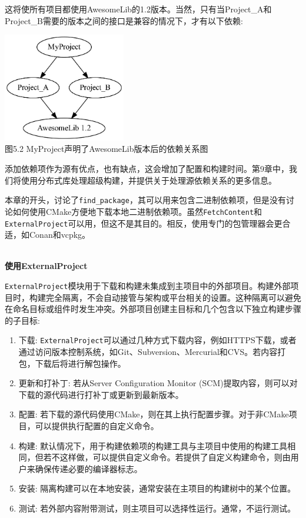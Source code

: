 这将使所有项目都使用AwesomeLib的1.2版本。当然，只有当Project\_A和Project\_B需要的版本之间的接口是兼容的情况下，才有以下依赖:

\begin{center}
\includegraphics[width=0.4\textwidth]{content/2/chapter5/images/2.jpg}\\
图5.2  MyProject声明了AwesomeLib版本后的依赖关系图
\end{center}

添加依赖项作为源有优点，也有缺点，这会增加了配置和构建时间。第9章中，我们将使用分布式库处理超级构建，并提供关于处理源依赖关系的更多信息。

本章的开头，讨论了\texttt{find\_package}，其可以用来包含二进制依赖项，但是没有讨论如何使用CMake方便地下载本地二进制依赖项。虽然\texttt{FetchContent}和\texttt{ExternalProject}可以用，但这不是其目的。相反，使用专门的包管理器会更合适，如Conan和vcpkg。

\hspace*{\fill} \\ %
\noindent
\textbf{使用ExternalProject}

\texttt{ExternalProject}模块用于下载和构建未集成到主项目中的外部项目。构建外部项目时，构建完全隔离，不会自动接管与架构或平台相关的设置。这种隔离可以避免在命名目标或组件时发生冲突。外部项目创建主目标和几个包含以下独立构建步骤的子目标:

\begin{enumerate}
\item 
下载: \texttt{ExternalProject}可以通过几种方式下载内容，例如HTTPS下载，或者通过访问版本控制系统，如Git、Subversion、Mercurial和CVS。若内容打包，下载后将进行解包操作。

\item 
更新和打补丁: 若从Server Configuration Monitor (SCM)提取内容，则可以对下载的源代码进行打补丁或更新到最新版本。

\item 
配置: 若下载的源代码使用CMake，则在其上执行配置步骤。对于非CMake项目，可以提供执行配置的自定义命令。

\item 
构建: 默认情况下，用于构建依赖项的构建工具与主项目中使用的构建工具相同，但若不这样做，可以提供自定义命令。若提供了自定义构建命令，则由用户来确保传递必要的编译器标志。

\item 
安装: 隔离构建可以在本地安装，通常安装在主项目的构建树中的某个位置。

\item 
测试: 若外部内容附带测试，则主项目可以选择性运行。通常，不运行测试。
\end{enumerate}


